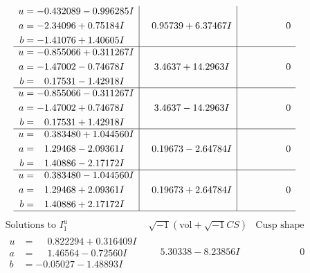 \documentclass[1p]{elsarticle_modified}
\theoremstyle{definition}
\newcommand{\I}{\sqrt{-1}}
\begin{document}
$$\begin{array}{c|c|c}
\begin{aligned}
u &= -0.432089 - 0.996285 I \\
a &= -2.34096 + 0.75184 I \\
b &= -1.41076 + 1.40605 I\end{aligned}
 & \phantom{-}0.95739 + 6.37467 I & \phantom{-0.000000 } 0 \\ \hline\begin{aligned}
u &= -0.855066 + 0.311267 I \\
a &= -1.47002 - 0.74678 I \\
b &= \phantom{-}0.17531 - 1.42918 I\end{aligned}
 & \phantom{-}3.4637 + 14.2963 I & \phantom{-0.000000 } 0 \\ \hline\begin{aligned}
u &= -0.855066 - 0.311267 I \\
a &= -1.47002 + 0.74678 I \\
b &= \phantom{-}0.17531 + 1.42918 I\end{aligned}
 & \phantom{-}3.4637 - 14.2963 I & \phantom{-0.000000 } 0 \\ \hline\begin{aligned}
u &= \phantom{-}0.383480 + 1.044560 I \\
a &= \phantom{-}1.29468 - 2.09361 I \\
b &= \phantom{-}1.40886 - 2.17172 I\end{aligned}
 & \phantom{-}0.19673 - 2.64784 I & \phantom{-0.000000 } 0 \\ \hline\begin{aligned}
u &= \phantom{-}0.383480 - 1.044560 I \\
a &= \phantom{-}1.29468 + 2.09361 I \\
b &= \phantom{-}1.40886 + 2.17172 I\end{aligned}
 & \phantom{-}0.19673 + 2.64784 I & \phantom{-0.000000 } 0\\
 \hline 
 \end{array}$$\newpage$$\begin{array}{c|c|c}  
\text{Solutions to }I^u_{1}& \I (\text{vol} + \sqrt{-1}CS) & \text{Cusp shape}\\
 \hline 
\begin{aligned}
u &= \phantom{-}0.822294 + 0.316409 I \\
a &= \phantom{-}1.46564 - 0.72560 I \\
b &= -0.05027 - 1.48893 I\end{aligned}
 & \phantom{-}5.30338 - 8.23856 I & \phantom{-0.000000 } 0 \\ \hline\begin{aligned}

\end{aligned}
\end{array}$$
\end{document}
